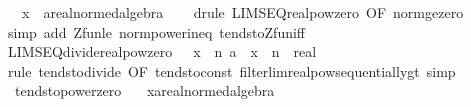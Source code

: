 \begin{isabellebody}
\ \ \ x\ {\isacharcolon}{\kern0pt}{\isacharcolon}{\kern0pt}\ {\isachardoublequoteopen}{\isacharprime}{\kern0pt}a{\isacharcolon}{\kern0pt}{\isacharcolon}{\kern0pt}real{\isacharunderscore}{\kern0pt}normed{\isacharunderscore}{\kern0pt}algebra{\isacharunderscore}{\kern0pt}{}{\isachardoublequoteclose}\isanewline
%
\isadelimproof
\ \ %
\endisadelimproof
%
\isatagproof
{}\isamarkupfalse%
\ {\isacharparenleft}{\kern0pt}drule\ LIMSEQ{\isacharunderscore}{\kern0pt}realpow{\isacharunderscore}{\kern0pt}zero\ {\isacharbrackleft}{\kern0pt}OF\ norm{\isacharunderscore}{\kern0pt}ge{\isacharunderscore}{\kern0pt}zero{\isacharbrackright}{\kern0pt}{\isacharparenright}{\kern0pt}\isanewline
\ \ \isamarkupfalse%
\ {\isacharparenleft}{\kern0pt}simp\ add{\isacharcolon}{\kern0pt}\ Zfun{\isacharunderscore}{\kern0pt}le\ norm{\isacharunderscore}{\kern0pt}power{\isacharunderscore}{\kern0pt}ineq\ tendsto{\isacharunderscore}{\kern0pt}Zfun{\isacharunderscore}{\kern0pt}iff{\isacharparenright}{\kern0pt}%
\endisatagproof
{\isafoldproof}%
%
\isadelimproof
\isanewline
%
\endisadelimproof
\isanewline
{}\isamarkupfalse%
\ LIMSEQ{\isacharunderscore}{\kern0pt}divide{\isacharunderscore}{\kern0pt}realpow{\isacharunderscore}{\kern0pt}zero{\isacharcolon}{\kern0pt}\ {\isachardoublequoteopen}{}\ {\isacharless}{\kern0pt}\ x\ {\isasymLongrightarrow}\ {\isacharparenleft}{\kern0pt}{\isasymlambda}n{\isachardot}{\kern0pt}\ a\ {\isacharslash}{\kern0pt}\ {\isacharparenleft}{\kern0pt}x\ {\isacharcircum}{\kern0pt}\ n{\isacharparenright}{\kern0pt}\ {\isacharcolon}{\kern0pt}{\isacharcolon}{\kern0pt}\ real{\isacharparenright}{\kern0pt}\ {\isasymlonglonglongrightarrow}\ {}{\isachardoublequoteclose}\isanewline
%
\isadelimproof
\ \ %
\endisadelimproof
%
\isatagproof
{}\isamarkupfalse%
\ {\isacharparenleft}{\kern0pt}rule\ tendsto{\isacharunderscore}{\kern0pt}divide{\isacharunderscore}{\kern0pt}{}\ {\isacharbrackleft}{\kern0pt}OF\ tendsto{\isacharunderscore}{\kern0pt}const\ filterlim{\isacharunderscore}{\kern0pt}realpow{\isacharunderscore}{\kern0pt}sequentially{\isacharunderscore}{\kern0pt}gt{}{\isacharbrackright}{\kern0pt}{\isacharparenright}{\kern0pt}\ simp%
\endisatagproof
{\isafoldproof}%
%
\isadelimproof
\isanewline
%
\endisadelimproof
\isanewline
{}\isamarkupfalse%
\isanewline
\ \ tendsto{\isacharunderscore}{\kern0pt}power{\isacharunderscore}{\kern0pt}zero{\isacharcolon}{\kern0pt}\isanewline
\ \ \ x{\isacharcolon}{\kern0pt}{\isacharcolon}{\kern0pt}{\isachardoublequoteopen}{\isacharprime}{\kern0pt}a{\isacharcolon}{\kern0pt}{\isacharcolon}{\kern0pt}real{\isacharunderscore}{\kern0pt}normed{\isacharunderscore}{\kern0pt}algebra{\isacharunderscore}{\kern0pt}{}{\isachardoublequoteclose}\isanewline

\end{isabellebody}
